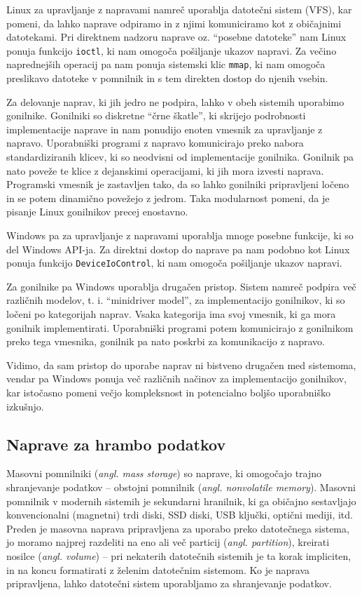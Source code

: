 \documentclass[a4paper,12pt,openright]{book}
\begin{document}
Linux za upravljanje z napravami namreč uporablja datotečni sistem (VFS), kar pomeni, da lahko naprave odpiramo in z njimi komuniciramo kot z običajnimi datotekami.
Pri direktnem nadzoru naprave oz. ``posebne datoteke'' nam Linux ponuja funkcijo \verb|ioctl|, ki nam omogoča pošiljanje ukazov napravi.
Za večino naprednejših operacij pa nam ponuja sistemski klic \verb|mmap|, ki nam omogoča preslikavo datoteke v pomnilnik in s tem direkten dostop do njenih vsebin.

Za delovanje naprav, ki jih jedro ne podpira, lahko v obeh sistemih uporabimo gonilnike.
Gonilniki so diskretne ``črne škatle'', ki skrijejo podrobnosti implementacije naprave in nam ponudijo enoten vmesnik za upravljanje z napravo.
Uporabniški programi z napravo komunicirajo preko nabora standardiziranih klicev, ki so neodvisni od implementacije gonilnika.
Gonilnik pa nato poveže te klice z dejanskimi operacijami, ki jih mora izvesti naprava.
Programski vmesnik je zastavljen tako, da so lahko gonilniki pripravljeni ločeno in se potem dinamično povežejo z jedrom.
Taka modularnost pomeni, da je pisanje Linux gonilnikov precej enostavno.
\cite{Corbet_Kroah-Hartman_Rubini_2005}

Windows pa za upravljanje z napravami uporablja mnoge posebne funkcije, ki so del Windows API-ja.
Za direktni dostop do naprave pa nam podobno kot Linux ponuja funkcijo \verb|DeviceIoControl|, ki nam omogoča pošiljanje ukazov napravi.

Za gonilnike pa Windows uporablja drugačen pristop.
Sistem namreč podpira več različnih modelov, t. i. ``minidriver model'', za implementacijo gonilnikov, ki so ločeni po kategorijah naprav.
Vsaka kategorija ima svoj vmesnik, ki ga mora gonilnik implementirati.
Uporabniški programi potem komunicirajo z gonilnikom preko tega vmesnika, gonilnik pa nato poskrbi za komunikacijo z napravo.
\cite{MS_Learn_driver_model_2023}

Vidimo, da sam pristop do uporabe naprav ni bistveno drugačen med sistemoma, vendar pa Windows ponuja več različnih načinov za implementacijo gonilnikov, kar istočasno pomeni večjo kompleksnost in potencialno boljšo uporabniško izkušnjo.

\subsection{Naprave za hrambo podatkov} \label{sec:device_management:data_storage}

Masovni pomnilniki (\textit{angl. mass storage}) so naprave, ki omogočajo trajno shranjevanje podatkov -- obstojni pomnilnik (\textit{angl. nonvolatile memory}).
Masovni pomnilnik v modernih sistemih je sekundarni hranilnik, ki ga običajno sestavljajo konvencionalni (magnetni) trdi diski, SSD diski, USB ključki, optični mediji, itd.
Preden je masovna naprava pripravljena za uporabo preko datotečnega sistema, jo moramo najprej razdeliti na eno ali več particij (\textit{angl. partition}), kreirati nosilce (\textit{angl. volume}) -- pri nekaterih datotečnih sistemih je ta korak impliciten, in na koncu formatirati z želenim datotečnim sistemom.
Ko je naprava pripravljena, lahko datotečni sistem uporabljamo za shranjevanje podatkov.
\cite{Silberschatz_Galvin_Gagne_2018}
\end{document}
